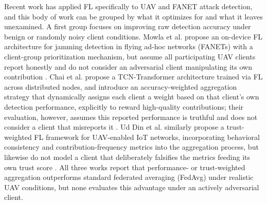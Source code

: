 \documentclass[journal]{IEEEtran}
\begin{document}
Recent work has applied FL specifically to UAV and FANET attack detection, and this body of work can be grouped by what it optimizes for and what it leaves unexamined. A first group focuses on improving raw detection accuracy under benign or randomly noisy client conditions. Mowla et al. propose an on-device FL architecture for jamming detection in flying ad-hoc networks (FANETs) with a client-group prioritization mechanism, but assume all participating UAV clients report honestly and do not consider an adversarial client manipulating its own contribution \cite{mowla2020federated}. Chai et al. propose a TCN-Transformer architecture trained via FL across distributed nodes, and introduce an accuracy-weighted aggregation strategy that dynamically assigns each client a weight based on that client's own detection performance, explicitly to reward high-quality contributions; their evaluation, however, assumes this reported performance is truthful and does not consider a client that misreports it \cite{chai2025navigation}. Ud Din et al. similarly propose a trust-weighted FL framework for UAV-enabled IoT networks, incorporating behavioral consistency and contribution-frequency metrics into the aggregation process, but likewise do not model a client that deliberately falsifies the metrics feeding its own trust score \cite{udin2025federated}. All three works report that performance- or trust-weighted aggregation outperforms standard federated averaging (FedAvg) under realistic UAV conditions, but none evaluates this advantage under an actively adversarial client.
\end{document}
